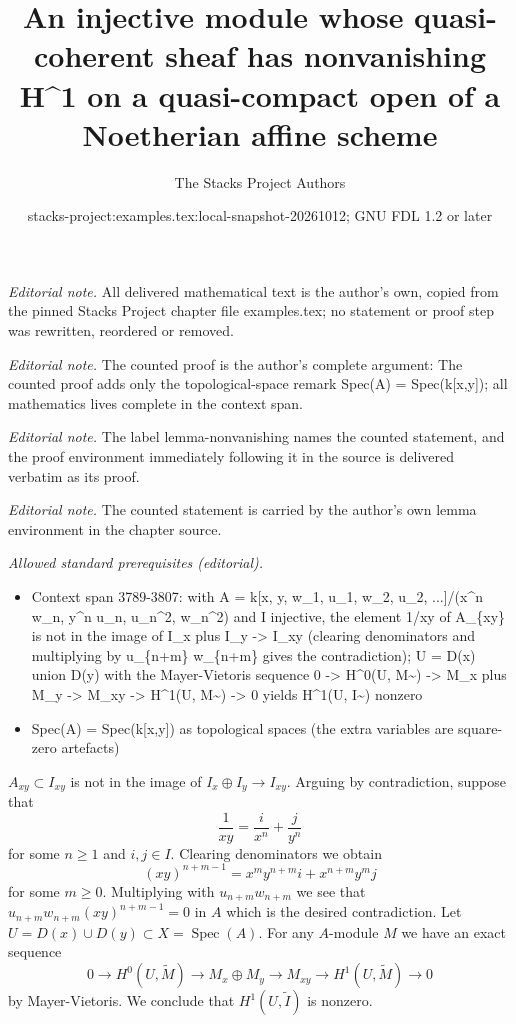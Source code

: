 \documentclass[10pt,a4paper]{amsart}
\title{An injective module whose quasi-coherent sheaf has nonvanishing H\textasciicircum{}1 on a quasi-compact open of a Noetherian affine scheme}
\author{The Stacks Project Authors}
\date{stacks-project:examples.tex:local-snapshot-20261012; GNU FDL 1.2 or later}
\theoremstyle{plain}
\theoremstyle{definition}
\theoremstyle{remark}
\numberwithin{equation}{subsection}
\def\Spec{\mathop{\mathrm{Spec}}}
\begin{document}
\maketitle
\noindent\textit{Editorial note.} All delivered mathematical text is the author's own, copied from the pinned Stacks Project chapter file examples.tex; no statement or proof step was rewritten, reordered or removed.\par\medskip
\noindent\textit{Editorial note.} The counted proof is the author's complete argument: The counted proof adds only the topological-space remark Spec(A) = Spec(k[x,y]); all mathematics lives complete in the context span.\par\medskip
\noindent\textit{Editorial note.} The label lemma-nonvanishing names the counted statement, and the proof environment immediately following it in the source is delivered verbatim as its proof.\par\medskip
\noindent\textit{Editorial note.} The counted statement is carried by the author's own lemma environment in the chapter source.\par\medskip
\noindent\textit{Allowed standard prerequisites (editorial).}\begin{itemize}
\item Context span 3789-3807: with A = k[x, y, w\_1, u\_1, w\_2, u\_2, ...]/(x\textasciicircum{}n w\_n, y\textasciicircum{}n u\_n, u\_n\textasciicircum{}2, w\_n\textasciicircum{}2) and I injective, the element 1/xy of A\_\{xy\} is not in the image of I\_x  plus  I\_y -> I\_xy (clearing denominators and multiplying by u\_\{n+m\} w\_\{n+m\} gives the contradiction); U = D(x)  union  D(y) with the Mayer-Vietoris sequence 0 -> H\textasciicircum{}0(U, M\textasciitilde{}) -> M\_x  plus  M\_y -> M\_xy -> H\textasciicircum{}1(U, M\textasciitilde{}) -> 0 yields H\textasciicircum{}1(U, I\textasciitilde{}) nonzero
\item Spec(A) = Spec(k[x,y]) as topological spaces (the extra variables are square-zero artefacts)
\end{itemize}\medskip
$A_{xy} \subset I_{xy}$ is not in the image of $I_x \oplus I_y \to I_{xy}$.
Arguing by contradiction, suppose that
$$
\frac{1}{xy} = \frac{i}{x^n} + \frac{j}{y^n}
$$
for some $n \geq 1$ and $i, j \in I$. Clearing denominators we obtain
$$
(xy)^{n + m - 1} = x^my^{n + m}i + x^{n + m}y^mj
$$
for some $m \geq 0$. Multiplying with $u_{n + m}w_{n + m}$ we see
that $u_{n + m}w_{n + m}(xy)^{n + m - 1} = 0$ in $A$ which is the
desired contradiction.
Let $U = D(x) \cup D(y) \subset X = \Spec(A)$. For any $A$-module
$M$ we have an exact sequence
$$
0 \to H^0(U, \widetilde{M}) \to M_x \oplus M_y \to M_{xy} \to
H^1(U, \widetilde{M}) \to 0
$$
by Mayer-Vietoris. We conclude that $H^1(U, \widetilde{I})$ is nonzero.
\end{document}
